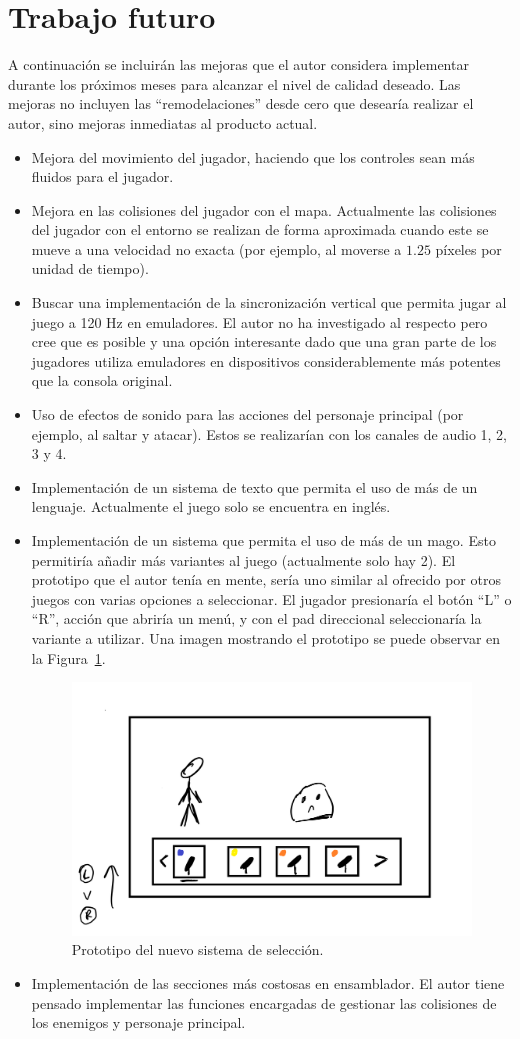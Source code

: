 \section{Trabajo futuro}
A continuación se incluirán las mejoras que el autor considera implementar durante los próximos meses para alcanzar el nivel de calidad deseado. Las mejoras no incluyen las ``remodelaciones'' desde cero que desearía realizar el autor, sino mejoras inmediatas al producto actual.

\begin{itemize}
	\item Mejora del movimiento del jugador, haciendo que los controles sean más fluidos para el jugador.
	\item Mejora en las colisiones del jugador con el mapa. Actualmente las colisiones del jugador con el entorno se realizan de forma aproximada cuando este se mueve a una velocidad no exacta (por ejemplo, al moverse a $1.25$ píxeles por unidad de tiempo). 
	\item Buscar una implementación de la sincronización vertical que permita jugar al juego a 120 Hz en emuladores. El autor no ha investigado al respecto pero cree que es posible y una opción interesante dado que una gran parte de los jugadores utiliza emuladores en dispositivos considerablemente más potentes que la consola original. 
	\item Uso de efectos de sonido para las acciones del personaje principal (por ejemplo, al saltar y atacar). Estos se realizarían con los canales de audio 1, 2, 3 y 4.
	\item Implementación de un sistema de texto que permita el uso de más de un lenguaje. Actualmente el juego solo se encuentra en inglés.
	\item Implementación de un sistema que permita el uso de más de un mago. Esto permitiría añadir más variantes al juego (actualmente solo hay 2). El prototipo que el autor tenía en mente, sería uno similar al ofrecido por otros juegos con varias opciones a seleccionar. El jugador presionaría el botón ``L'' o ``R'', acción que abriría un menú, y con el pad direccional seleccionaría la variante a utilizar. Una imagen mostrando el prototipo se puede observar en la Figura~\ref{fig:menu_proto}.

	\begin{figure}[h]
		\centering
		\includegraphics[width=.5\textwidth]{capitulos/capitulo7/proto.png}
		\caption{Prototipo del nuevo sistema de selección.}\label{fig:menu_proto}
	\end{figure}
	\FloatBarrier{}

	\item Implementación de las secciones más costosas en ensamblador. El autor tiene pensado implementar las funciones encargadas de gestionar las colisiones de los enemigos y personaje principal.
\end{itemize}
